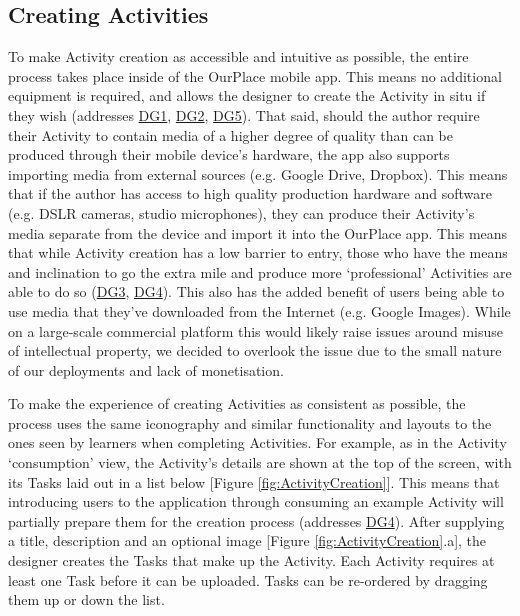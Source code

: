 \subsection{Creating Activities}

To make Activity creation as accessible and intuitive as possible, the entire process takes place inside of the OurPlace mobile app. This means no additional equipment is required, and allows the designer to create the Activity in situ if they wish (addresses \hyperref[DG1]{DG1}, \hyperref[DG2]{DG2}, \hyperref[DG5]{DG5}). That said, should the author require their Activity to contain media of a higher degree of quality than can be produced through their mobile device's hardware, the app also supports importing media from external sources (e.g. Google Drive, Dropbox). This means that if the author has access to high quality production hardware and software (e.g. DSLR cameras, studio microphones), they can produce their Activity's media separate from the device and import it into the OurPlace app. This means that while Activity creation has a low barrier to entry, those who have the means and inclination to go the extra mile and produce more `professional' Activities are able to do so (\hyperref[DG3]{DG3}, \hyperref[DG4]{DG4}). This also has the added benefit of users being able to use media that they've downloaded from the Internet (e.g. Google Images). While on a large-scale commercial platform this would likely raise issues around misuse of intellectual property, we decided to overlook the issue due to the small nature of our deployments and lack of monetisation.

To make the experience of creating Activities as consistent as possible, the process uses the same iconography and similar functionality and layouts to the ones seen by learners when completing Activities. For example, as in the Activity `consumption' view, the Activity's details are shown at the top of the screen, with its Tasks laid out in a list below [Figure \ref{fig:ActivityCreation}]. This means that introducing users to the application through consuming an example Activity will partially prepare them for the creation process (addresses \hyperref[DG4]{DG4}). After supplying a title, description and an optional image [Figure \ref{fig:ActivityCreation}.a], the designer creates the Tasks that make up the Activity. Each Activity requires at least one Task before it can be uploaded. Tasks can be re-ordered by dragging them up or down the list.

